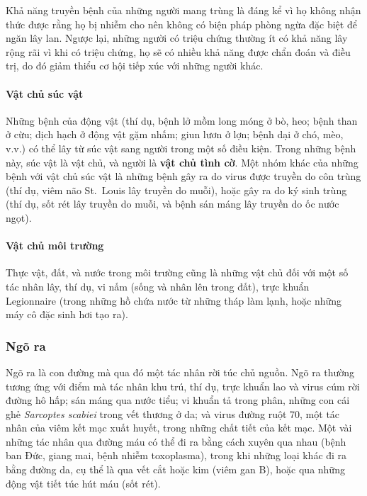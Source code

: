 \documentclass[
]{book}
\begin{document}
Khả năng truyền bệnh của những người mang trùng là đáng kể vì họ không nhận thức được rằng họ bị nhiễm cho nên không có biện pháp phòng ngừa đặc biệt để ngăn lây lan. Ngược lại, những người có triệu chứng thường ít có khả năng lây rộng rãi vì khi có triệu chứng, họ sẽ có nhiều khả năng được chẩn đoán và điều trị, do đó giảm thiểu cơ hội tiếp xúc với những người khác.

\hypertarget{vux1eadt-chux1ee7-suxfac-vux1eadt}{%
\paragraph{Vật chủ súc vật}\label{vux1eadt-chux1ee7-suxfac-vux1eadt}}

Những bệnh của động vật (thí dụ, bệnh lở mồm long móng ở bò, heo; bệnh than ở cừu; dịch hạch ở động vật gặm nhấm; giun lươn ở lợn; bệnh dại ở chó, mèo, v.v.) có thể lây từ súc vật sang người trong một số điều kiện. Trong những bệnh này, súc vật là vật chủ, và người là \textbf{vật chủ tình cờ}. Một nhóm khác của những bệnh với vật chủ súc vật là những bệnh gây ra do virus được truyền do côn trùng (thí dụ, viêm não St.~Louis lây truyền do muỗi), hoặc gây ra do ký sinh trùng (thí dụ, sốt rét lây truyền do muỗi, và bệnh sán máng lây truyền do ốc nước ngọt).

\hypertarget{vux1eadt-chux1ee7-muxf4i-trux1b0ux1eddng}{%
\paragraph{Vật chủ môi trường}\label{vux1eadt-chux1ee7-muxf4i-trux1b0ux1eddng}}

Thực vật, đất, và nước trong môi trường cũng là những vật chủ đối với một số tác nhân lây, thí dụ, vi nấm (sống và nhân lên trong đất), trực khuẩn Legionnaire (trong những hồ chứa nước từ những tháp làm lạnh, hoặc những máy cô đặc sinh hơi tạo ra).

\hypertarget{nguxf5-ra}{%
\subsubsection{Ngõ ra}\label{nguxf5-ra}}

Ngõ ra là con đường mà qua đó một tác nhân rời túc chủ nguồn. Ngõ ra thường tương ứng với điểm mà tác nhân khu trú, thí dụ, trực khuẩn lao và virus cúm rời đường hô hấp; sán máng qua nước tiểu; vi khuẩn tả trong phân, những con cái ghẻ \emph{Sarcoptes scabiei} trong vết thương ở da; và virus đường ruột 70, một tác nhân của viêm kết mạc xuất huyết, trong những chất tiết của kết mạc. Một vài những tác nhân qua đường máu có thể đi ra bằng cách xuyên qua nhau (bệnh ban Đức, giang mai, bệnh nhiễm toxoplasma), trong khi những loại khác đi ra bằng đường da, cụ thể là qua vết cắt hoặc kim (viêm gan B), hoặc qua những động vật tiết túc hút máu (sốt rét).
\end{document}
